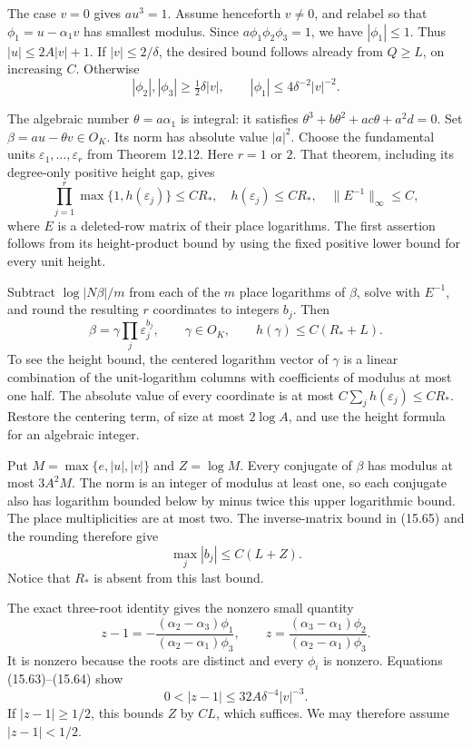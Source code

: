 \documentclass[
  11pt,
  a4paper,
]{article}
\begin{document}
The case \(v=0\) gives \(au^3=1\). Assume henceforth \(v\ne0\), and
relabel so that \(\phi_1=u-\alpha_1v\) has smallest modulus. Since
\(a\phi_1\phi_2\phi_3=1\), we have \(|\phi_1|\le1\). Thus
\(|u|\le2A|v|+1\). If \(|v|\le2/\delta\), the desired bound follows
already from \(Q\ge L\), on increasing \(C\). Otherwise \[
|\phi_2|,|\phi_3|\ge\tfrac12\delta|v|,\qquad
|\phi_1|\le4\delta^{-2}|v|^{-2}.
\tag{15.64}
\]

The algebraic number \(\theta=a\alpha_1\) is integral: it satisfies
\(\theta^3+b\theta^2+ac\theta+a^2d=0\). Set
\(\beta=au-\theta v\in O_K\). Its norm has absolute value \(|a|^2\).
Choose the fundamental units \(\varepsilon_1,\ldots,\varepsilon_r\) from
Theorem 12.12. Here \(r=1\) or \(2\). That theorem, including its
degree-only positive height gap, gives \[
\prod_{j=1}^r\max\{1,h(\varepsilon_j)\}\le C R_*,
\quad h(\varepsilon_j)\le C R_*,
\quad \|E^{-1}\|_\infty\le C,
\tag{15.65}
\] where \(E\) is a deleted-row matrix of their place logarithms. The
first assertion follows from its height-product bound by using the fixed
positive lower bound for every unit height.

Subtract \(\log|N\beta|/m\) from each of the \(m\) place logarithms of
\(\beta\), solve with \(E^{-1}\), and round the resulting \(r\)
coordinates to integers \(b_j\). Then \[
\beta=\gamma\prod_j\varepsilon_j^{b_j},\qquad
\gamma\in O_K,\qquad
h(\gamma)\le C(R_*+L).
\tag{15.66}
\] To see the height bound, the centered logarithm vector of \(\gamma\)
is a linear combination of the unit-logarithm columns with coefficients
of modulus at most one half. The absolute value of every coordinate is
at most \(C\sum_j h(\varepsilon_j)\le CR_*\). Restore the centering
term, of size at most \(2\log A\), and use the height formula for an
algebraic integer.

Put \(M=\max\{e,|u|,|v|\}\) and \(Z=\log M\). Every conjugate of
\(\beta\) has modulus at most \(3A^2M\). The norm is an integer of
modulus at least one, so each conjugate also has logarithm bounded below
by minus twice this upper logarithmic bound. The place multiplicities
are at most two. The inverse-matrix bound in (15.65) and the rounding
therefore give \[
\max_j|b_j|\le C(L+Z).
\tag{15.67}
\] Notice that \(R_*\) is absent from this last bound.

The exact three-root identity gives the nonzero small quantity \[
z-1=
-\frac{(\alpha_2-\alpha_3)\phi_1}
        {(\alpha_2-\alpha_1)\phi_3},\qquad
z=\frac{(\alpha_3-\alpha_1)\phi_2}
        {(\alpha_2-\alpha_1)\phi_3}.
\tag{15.68}
\] It is nonzero because the roots are distinct and every \(\phi_i\) is
nonzero. Equations (15.63)--(15.64) show \[
0<|z-1|\le32A\delta^{-4}|v|^{-3}.
\tag{15.69}
\] If \(|z-1|\ge1/2\), this bounds \(Z\) by \(CL\), which suffices. We
may therefore assume \(|z-1|<1/2\).
\end{document}
